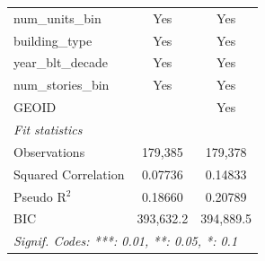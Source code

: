 \begin{tabular}{lcc}
   num\_units\_bin                 & Yes             & Yes\\  
   building\_type                  & Yes             & Yes\\  
   year\_blt\_decade               & Yes             & Yes\\  
   num\_stories\_bin               & Yes             & Yes\\  
   GEOID                           &                 & Yes\\  
   \midrule
   \emph{Fit statistics}\\
   Observations                    & 179,385         & 179,378\\  
   Squared Correlation             & 0.07736         & 0.14833\\  
   Pseudo R$^2$                    & 0.18660         & 0.20789\\  
   BIC                             & 393,632.2       & 394,889.5\\  
   \midrule \midrule
   \multicolumn{3}{l}{\emph{Signif. Codes: ***: 0.01, **: 0.05, *: 0.1}}\\
\end{tabular}
\par\endgroup
